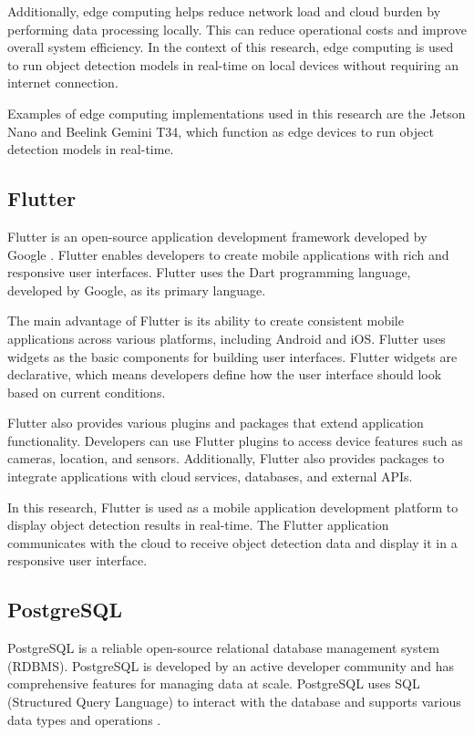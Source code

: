Additionally, edge computing helps reduce network load and cloud burden by performing data processing locally. This can reduce operational costs and improve overall system efficiency. In the context of this research, edge computing is used to run object detection models in real-time on local devices without requiring an internet connection.

Examples of edge computing implementations used in this research are the Jetson Nano and Beelink Gemini T34, which function as edge devices to run object detection models in real-time.

\subsection{\textbf{Flutter}}

Flutter is an open-source application development framework developed by Google \cite{google2024}. Flutter enables developers to create mobile applications with rich and responsive user interfaces. Flutter uses the Dart programming language, developed by Google, as its primary language.

The main advantage of Flutter is its ability to create consistent mobile applications across various platforms, including Android and iOS. Flutter uses widgets as the basic components for building user interfaces. Flutter widgets are declarative, which means developers define how the user interface should look based on current conditions.

Flutter also provides various plugins and packages that extend application functionality. Developers can use Flutter plugins to access device features such as cameras, location, and sensors. Additionally, Flutter also provides packages to integrate applications with cloud services, databases, and external APIs.

In this research, Flutter is used as a mobile application development platform to display object detection results in real-time. The Flutter application communicates with the cloud to receive object detection data and display it in a responsive user interface.

\subsection{\textbf{PostgreSQL}}

PostgreSQL is a reliable open-source relational database management system (RDBMS). PostgreSQL is developed by an active developer community and has comprehensive features for managing data at scale. PostgreSQL uses SQL (Structured Query Language) to interact with the database and supports various data types and operations \cite{postgresql2025}.

